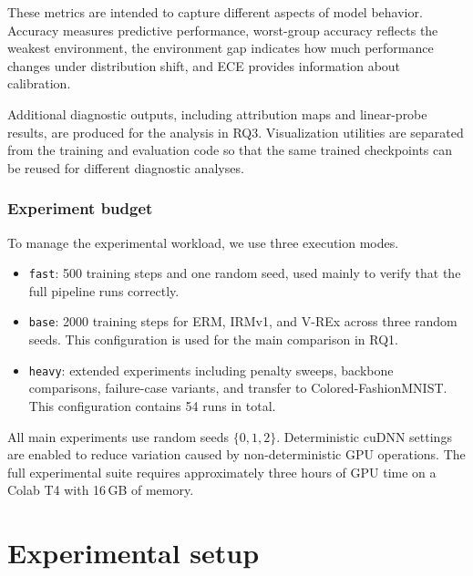 \documentclass[12pt,a4paper]{article}
\begin{document}
These metrics are intended to capture different aspects of model behavior. Accuracy
measures predictive performance, worst-group accuracy reflects the weakest environment,
the environment gap indicates how much performance changes under distribution shift,
and ECE provides information about calibration.

Additional diagnostic outputs, including attribution maps and linear-probe results,
are produced for the analysis in RQ3. Visualization utilities are separated from the
training and evaluation code so that the same trained checkpoints can be reused for
different diagnostic analyses.

\subsubsection{Experiment budget}
To manage the experimental workload, we use three execution modes.

\begin{itemize}
    \item \texttt{fast}: 500 training steps and one random seed, used mainly to verify
    that the full pipeline runs correctly.
    
    \item \texttt{base}: 2000 training steps for ERM, IRMv1, and V-REx across three
    random seeds. This configuration is used for the main comparison in RQ1.
    
    \item \texttt{heavy}: extended experiments including penalty sweeps, backbone
    comparisons, failure-case variants, and transfer to Colored-Fashion\-MNIST.
    This configuration contains 54 runs in total.
\end{itemize}

All main experiments use random seeds $\{0,1,2\}$. Deterministic cuDNN settings are
enabled to reduce variation caused by non-deterministic GPU operations. The full
experimental suite requires approximately three hours of GPU time on a Colab T4
with 16\,GB of memory.

\endgroup
\clearpage
\section{Experimental setup}\label{sec:experiments}
\end{document}
